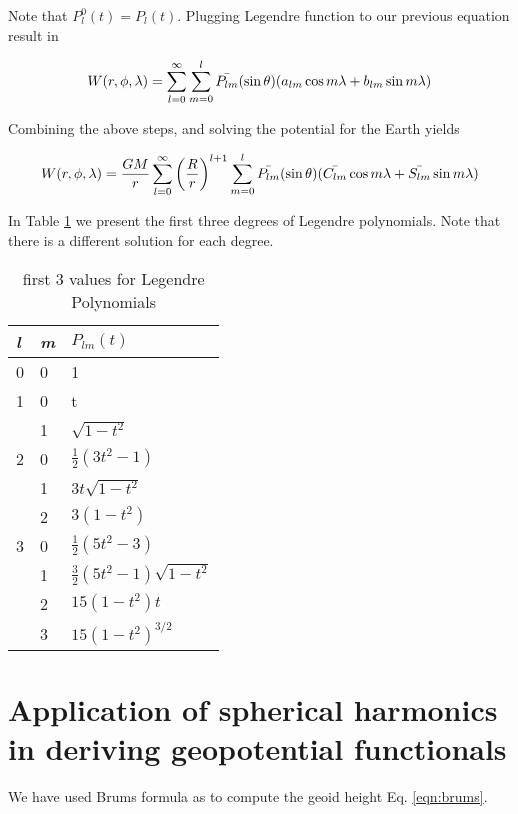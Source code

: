 Note that $P_l^0(t) = P_l(t)$. Plugging Legendre function to our previous equation result in

\begin{equation}
	W(r, \phi, \lambda) = \sum_{l=0}^{\infty}\sum_{m=0}^{l}\bar{P_{lm}}(\sin \theta)(a_{lm} \cos m \lambda \\
	+ b_{lm} \sin m \lambda)
\end{equation}

Combining the above steps, and solving the potential for the Earth yields

\begin{equation}
W(r, \phi, \lambda) = \frac{GM}{r}\sum_{l=0}^{\infty}\left(\frac{R}{r}\right)^{l+1}\sum_{m=0}^{l}\bar{P_{lm}}(\sin \theta)(\bar{C_{lm}} \cos m \lambda \\
+ \bar{S_{lm}} \sin m \lambda)
\end{equation}

In Table \ref{table:alfs} we present the first three degrees of Legendre polynomials. Note that there is a different solution for each degree.
 \begin{table}[]
 	\centering
 	\caption{first 3 values for Legendre Polynomials}
 	\label{table:alfs}
 	\begin{tabular}{@{}lll@{}}
 		\toprule
 		\emph{l} & \emph{m} & $P_{lm}(t)$\\ \midrule
 		0 & 0 & 1\\
 		1 & 0 & t \\
 		& 1 & $\sqrt{1-t^2}$\\
 		2 & 0 & $\tfrac{1}{2}(3t^2-1)$\\
 		& 1 & $3t\sqrt{1-t^2}$\\
 		& 2 & $3(1-t^2)$\\
 		3 & 0 & $\tfrac{1}{2}(5t^2-3)$\\
 		& 1 & $\tfrac{3}{2}(5t^2-1)\sqrt{1-t^2}$\\
 		& 2 & $15(1-t^2)t$\\
 		& 3 & $15(1-t^2)^{3/2}$\\  \bottomrule
 		
 	\end{tabular}
 \end{table}
 
 \section{Application of spherical harmonics in deriving geopotential functionals}
 We have used Brums formula as to compute the geoid height Eq. \ref{eqn:brums}. 
 
